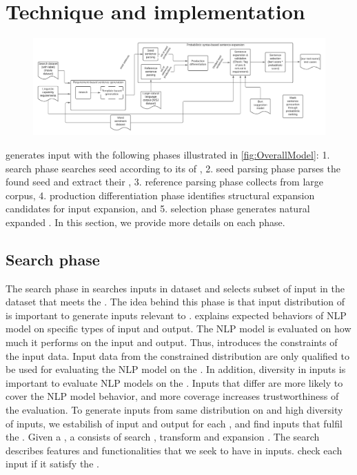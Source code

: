 \section{Technique and implementation}

\begin{figure}
  \centering
  \includegraphics[scale=0.5]{figs/overview.pdf}
  \vspace{-5pt}
  \caption{\OverallModelFigCaption}
  \vspace{-10pt}
\end{figure}

\Model generates input \sents with the following phases illustrated in
\ref{fig:OverallModel}: 1. search phase searches seed \sents according
to its \req of \lc, 2. seed parsing phase parses the found seed \sents
and extract their \cfg, 3. reference parsing phase collects \pcfg from
large corpus, 4. production differentiation phase identifies
structural expansion candidates for input expansion, and 5.\sent
selection phase generates natural expanded \sent. In this section, we
provide more details on each phase.

\subsection{Search phase}
The search phase in \Model searches inputs in dataset and selects
subset of input \sents in the dataset that meets the \lc
\req. The idea behind this phase is that input distribution of
\lc is important to generate inputs relevant to \lc. \Lc explains
expected behaviors of NLP model on specific types of input and
output. The NLP model is evaluated on how much it performs on the
input and output. Thus, \lc introduces the constraints of the input
data. Input data from the constrained distribution are only qualified
to be used for evaluating the NLP model on the \lc.  In addition,
diversity in inputs is important to evaluate NLP models on the
\lc. Inputs that differ are more likely to cover the NLP model
behavior, and more coverage increases trustworthiness of the
evaluation. To generate inputs from same distribution on \lc and high
diversity of inputs, we estabilish \reqs of input and output
for each \lc, and find inputs that fulfil the \reqs. Given a
\lc, a \req consists of search \req, transform
\req and expansion \req. The search \req
describes features and functionalities that we seek to have in
inputs. \Model check each input if it satisfy the \req.

